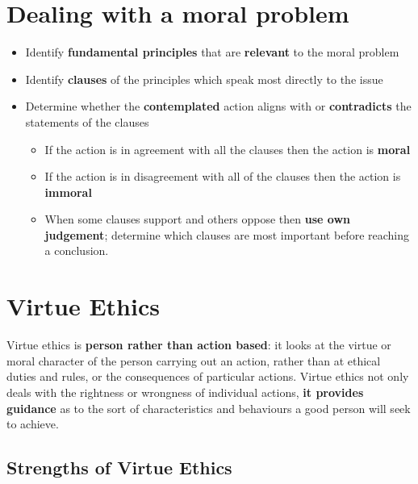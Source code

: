 \documentclass{article}
\begin{document}
\section{Dealing with a moral problem}

\begin{itemize}
  \item Identify \textbf{fundamental principles} that are \textbf{relevant} to the moral problem
  \item Identify \textbf{clauses} of the principles which speak most directly to the issue
  \item Determine whether the \textbf{contemplated} action aligns with or \textbf{contradicts} the statements of the clauses
  \begin{itemize}
    \item If the action is in agreement with all the clauses then the action is \textbf{moral}
    \item If the action is in disagreement with all of the clauses then the action is \textbf{immoral}
    \item When some clauses support and others oppose then \textbf{use own judgement}; determine which clauses are most important before reaching a conclusion.
  \end{itemize}
\end{itemize}

\section{Virtue Ethics}

\begin{flushleft}
Virtue ethics is \textbf{person rather than action based}: it looks at the virtue or moral character of the person carrying out an action, rather than at ethical duties and rules, or the consequences of particular actions. Virtue ethics not only deals with the rightness or wrongness of individual actions, \textbf{it provides guidance} as to the sort of characteristics and behaviours a good person will seek to achieve.
\end{flushleft}

\subsection{Strengths of Virtue Ethics}
\end{document}
